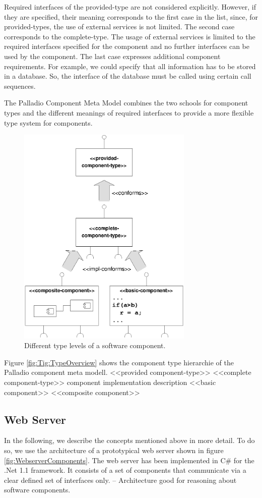 Required interfaces of the provided-type are not considered explicitly. However,
if they are specified, their meaning corresponds to the first case in the list,
since, for provided-types, the use of external services is not limited. The
second case corresponds to the complete-type. The usage of external services is
limited to the required interfaces specified for the component and no further
interfaces can be used by the component. The last case expresses additional
component requirements. For example, we could specify that all information has
to be stored in a database. So, the interface of the database must be called
using certain call sequences.

The Palladio Component Meta Model combines the two schools for component types
and the different meanings of required interfaces to provide a more flexible
type system for components.

\begin{figure}[htbp]
\centering
\includegraphics[width=3.3in]{example/Overview_TypeHierarchie}
\caption{Different type levels of a software component.}
\label{fig:TypeOverview}
\end{figure}

Figure \ref{fig:Tig:TypeOverview} shows the component type
hierarchie of the Palladio component meta modell.
<<provided component-type>>
<<complete component-type>>
component implementation description
<<basic component>> <<composite component>>


\subsection{Web Server}
In the following, we describe the concepts mentioned above in more detail. To do
so, we use the architecture of a prototypical web server shown in figure
\ref{fig:WebserverComponents}. The web server has been implemented in C\# for
the .Net 1.1 framework. It consists of a set of components that
communicate via a clear defined set of interfaces only. -- Architecture good
for reasoning about software components.

